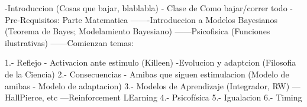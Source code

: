  
-Introduccion (Cosas que bajar, blablabla) - Clase de Como bajar/correr todo
-Pre-Requisitos: Parte Matematica
-------Introduccion a Modelos Bayesianos (Teorema de Bayes; Modelamiento Bayesiano)
------Psicofisica (Funciones ilustrativas)
------Comienzan temas:

1.- Reflejo - Activacion ante estimulo (Killeen)
-Evolucion  y adaptcion (Filosofia de la Ciencia)
2.- Consecuencias - Amibas que siguen estimulacion (Modelo de amibas - Modelo de adaptacion)
3.- Modelos de Aprendizaje (Integrador, RW)
---HallPierce, etc
---Reinforcement LEarning
4.- Psicofísica
5.- Igualacion
6.- Timing


